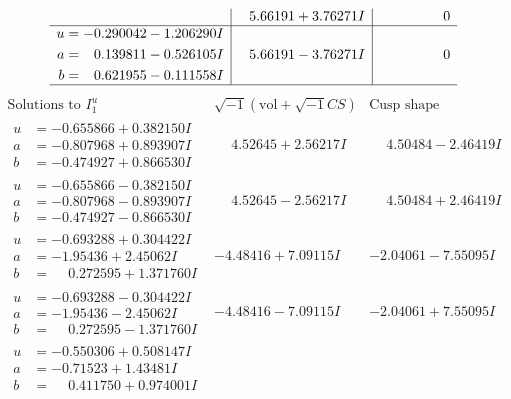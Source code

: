 \documentclass[1p]{elsarticle_modified}
\theoremstyle{definition}
\newcommand{\I}{\sqrt{-1}}
\begin{document}
$$\begin{array}{c|c|c}
 & \phantom{-}5.66191 + 3.76271 I & \phantom{-0.000000 } 0 \\ \hline\begin{aligned}
u &= -0.290042 - 1.206290 I \\
a &= \phantom{-}0.139811 - 0.526105 I \\
b &= \phantom{-}0.621955 - 0.111558 I\end{aligned}
 & \phantom{-}5.66191 - 3.76271 I & \phantom{-0.000000 } 0\\
 \hline 
 \end{array}$$\newpage$$\begin{array}{c|c|c}  
\text{Solutions to }I^u_{1}& \I (\text{vol} + \sqrt{-1}CS) & \text{Cusp shape}\\
 \hline 
\begin{aligned}
u &= -0.655866 + 0.382150 I \\
a &= -0.807968 + 0.893907 I \\
b &= -0.474927 + 0.866530 I\end{aligned}
 & \phantom{-}4.52645 + 2.56217 I & \phantom{-}4.50484 - 2.46419 I \\ \hline\begin{aligned}
u &= -0.655866 - 0.382150 I \\
a &= -0.807968 - 0.893907 I \\
b &= -0.474927 - 0.866530 I\end{aligned}
 & \phantom{-}4.52645 - 2.56217 I & \phantom{-}4.50484 + 2.46419 I \\ \hline\begin{aligned}
u &= -0.693288 + 0.304422 I \\
a &= -1.95436 + 2.45062 I \\
b &= \phantom{-}0.272595 + 1.371760 I\end{aligned}
 & -4.48416 + 7.09115 I & -2.04061 - 7.55095 I \\ \hline\begin{aligned}
u &= -0.693288 - 0.304422 I \\
a &= -1.95436 - 2.45062 I \\
b &= \phantom{-}0.272595 - 1.371760 I\end{aligned}
 & -4.48416 - 7.09115 I & -2.04061 + 7.55095 I \\ \hline\begin{aligned}
u &= -0.550306 + 0.508147 I \\
a &= -0.71523 + 1.43481 I \\
b &= \phantom{-}0.411750 + 0.974001 I\end{aligned}

\end{array}$$
\end{document}
